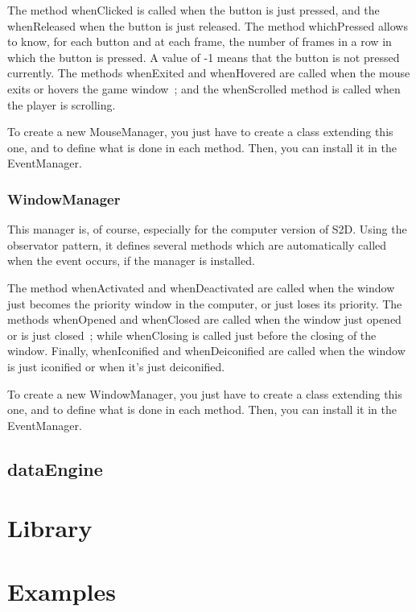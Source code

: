 \documentclass[a4paper,11pt]{report}
\begin{document}
			The method whenClicked is called when the button is just pressed, and the whenReleased when the button is just released.
			The method whichPressed allows to know, for each button and at each frame, the number of frames in a row in which the button is pressed.
			A value of -1 means that the button is not pressed currently.
			The methods whenExited and whenHovered are called when the mouse exits or hovers the game window~;
			and the whenScrolled method is called when the player is scrolling.
			
			To create a new MouseManager, you just have to create a class extending this one, and to define what is done in each method.
			Then, you can install it in the EventManager.
			
		\subsection{WindowManager}
			This manager is, of course, especially for the computer version of S2D.
			Using the observator pattern, it defines several methods which are automatically called when the event occurs, if the manager is installed.
			
			The method whenActivated and whenDeactivated are called when the window just becomes the priority window in the computer, or just loses its priority.
			The methods whenOpened and whenClosed are called when the window just opened or is just closed~; while whenClosing is called just before the closing of the window.
			Finally, whenIconified and whenDeiconified are called when the window is just iconified or when it's just deiconified.
			
			To create a new WindowManager, you just have to create a class extending this one, and to define what is done in each method.
			Then, you can install it in the EventManager.
	
	\section{dataEngine} \label{DataEngine}
	
	\chapter{Library} \label{Library}
	
	\chapter{Examples}
\end{document}
